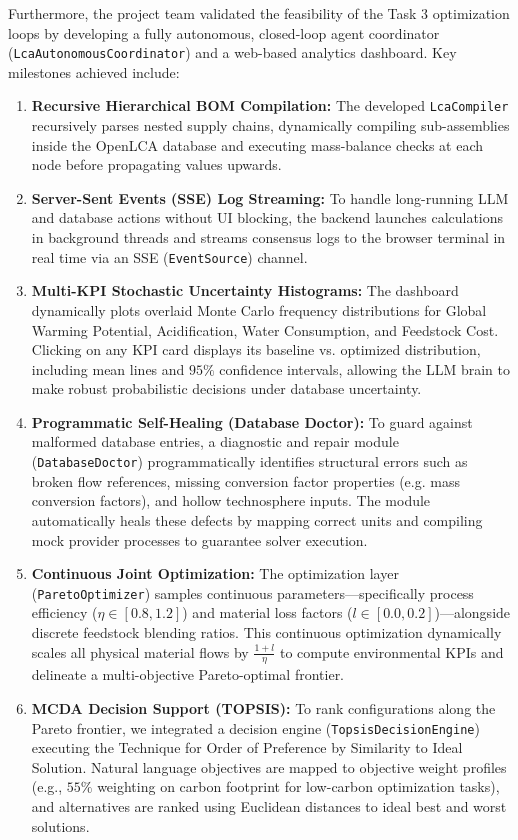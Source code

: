 \documentclass[11pt]{article}
\begin{document}
Furthermore, the project team validated the feasibility of the Task 3 optimization loops by developing a fully autonomous, closed-loop agent coordinator (\texttt{LcaAutonomousCoordinator}) and a web-based analytics dashboard. Key milestones achieved include:
\begin{enumerate}
    \item \textbf{Recursive Hierarchical BOM Compilation:} The developed \texttt{LcaCompiler} recursively parses nested supply chains, dynamically compiling sub-assemblies inside the OpenLCA database and executing mass-balance checks at each node before propagating values upwards.
    \item \textbf{Server-Sent Events (SSE) Log Streaming:} To handle long-running LLM and database actions without UI blocking, the backend launches calculations in background threads and streams consensus logs to the browser terminal in real time via an SSE (\texttt{EventSource}) channel.
    \item \textbf{Multi-KPI Stochastic Uncertainty Histograms:} The dashboard dynamically plots overlaid Monte Carlo frequency distributions for Global Warming Potential, Acidification, Water Consumption, and Feedstock Cost. Clicking on any KPI card displays its baseline vs. optimized distribution, including mean lines and $95\%$ confidence intervals, allowing the LLM brain to make robust probabilistic decisions under database uncertainty.
    \item \textbf{Programmatic Self-Healing (Database Doctor):} To guard against malformed database entries, a diagnostic and repair module (\texttt{DatabaseDoctor}) programmatically identifies structural errors such as broken flow references, missing conversion factor properties (e.g. mass conversion factors), and hollow technosphere inputs. The module automatically heals these defects by mapping correct units and compiling mock provider processes to guarantee solver execution.
    \item \textbf{Continuous Joint Optimization:} The optimization layer (\texttt{ParetoOptimizer}) samples continuous parameters---specifically process efficiency ($\eta \in [0.8, 1.2]$) and material loss factors ($l \in [0.0, 0.2]$)---alongside discrete feedstock blending ratios. This continuous optimization dynamically scales all physical material flows by $\frac{1+l}{\eta}$ to compute environmental KPIs and delineate a multi-objective Pareto-optimal frontier.
    \item \textbf{MCDA Decision Support (TOPSIS):} To rank configurations along the Pareto frontier, we integrated a decision engine (\texttt{TopsisDecisionEngine}) executing the Technique for Order of Preference by Similarity to Ideal Solution. Natural language objectives are mapped to objective weight profiles (e.g., $55\%$ weighting on carbon footprint for low-carbon optimization tasks), and alternatives are ranked using Euclidean distances to ideal best and worst solutions.
\end{enumerate}
\end{document}
